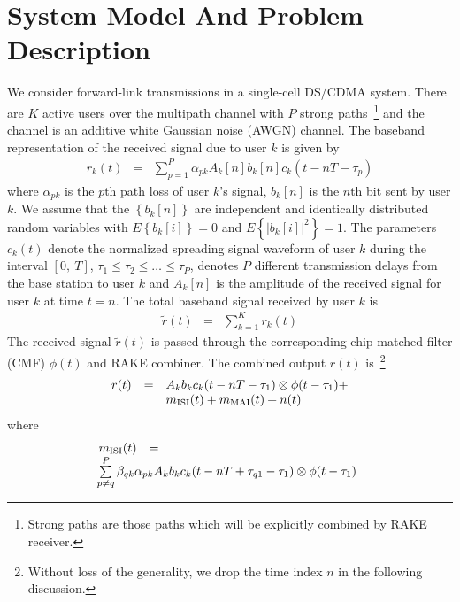 \documentclass[a4paper,10pt,fleqn, twocolumn]{IEEETran}
\begin{document}
\section{System Model And Problem Description}
We consider forward-link transmissions in a single-cell DS/CDMA
system. There are $K$ active users over the multipath channel with
$P$ strong paths~\footnote{Strong paths are those paths which will
be explicitly combined by RAKE receiver.} and the channel is an
additive white Gaussian noise (AWGN) channel. The baseband
representation of the received signal due to user $k$ is given by
\begin{equation}
\begin{array}{rcl}
r_k(t)&=&\sum\limits_{p=1}^{P}\alpha_{pk}A_k[n]
b_k[n]c_k(t-nT-\tau_p)
\end{array}
\end{equation}
\noindent where $\alpha_{pk}$ is the $p$th path loss of user $k$'s
signal, $b_k{[n]}$ is the $n$th bit sent by user $k$. We assume
that the $\left\{b_k{[n]}\right\}$ are independent and identically
distributed random variables with $E\left\{b_k{[i]}\right\}=0$ and
$E\left\{|b_k{[i]}|^2\right\}=1$. The parameters $c_k(t)$ denote
the normalized spreading signal waveform of user $k$ during the
interval $[0,\ T]$, $\tau_1\leq\tau_2\leq\ldots\leq\tau_P$,
denotes $P$ different transmission delays from the base station to
user $k$ and $A_k[n]$ is the amplitude of the received signal for
user $k$ at time $t=n$. The total baseband signal received by user
$k$ is
\begin{equation}
\begin{array}{rcl}
\tilde{r}(t)&=&\sum\limits_{k=1}^{K}r_k(t)
\end{array}
\end{equation}
The received signal $\tilde{r}(t)$ is passed through the
corresponding chip matched filter (CMF) $\phi(t)$ and RAKE
combiner. The combined output $r(t)$ is~\footnote{Without loss of
the generality, we drop the time index $n$ in the following
discussion.}
\begin{equation}\hspace{-0.0in}
\begin{array}{rcl}
r(t)&=&A_k b_k c_k(t-nT-\tau_1)\otimes \phi(t-\tau_1)+ \\
&&\hspace{0.0in} m_{\rm ISI}(t) + m_{\rm MAI}(t) + n(t)
\end{array}\label{r_t}
\end{equation}
\noindent where
\begin{equation} \hspace{-0.05in}
\begin{array}{rcl}
 m_{\rm ISI}(t)&=&\\
 &&\hspace{-0.83in}\sum\limits^{P}_{p\neq
q}\beta_{qk} \alpha_{pk}A_kb_kc_k(t-nT+\tau_{q1}-\tau_1)\otimes
\phi(t-\tau_1)
\end{array}
\end{equation}
\end{document}
